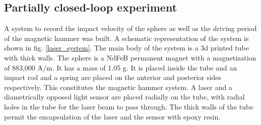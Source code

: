 \documentclass[letterpaper, 10 pt, conference]{ieeeconf}  %
\begin{document}
\begin{table}[]
\centering
\caption{Properties of the coils used in the magnetic test bench}
\label{coil_table}
\vspace{-1.5em}
\end{table}


\subsection{Partially closed-loop experiment}
\label{partialCLexp}
A system to record the impact velocity of the sphere as well as the driving period of the magnetic hammer was built. A schematic representation of the system is shown in fig. \ref{laser_system}. The main body of the system is a 3d printed tube with thick walls. The sphere is a NdFeB permanent magnet with a magnetization of 883,000 A/m. It has a mass of 1.05 g. It is placed inside the tube and an impact rod and a spring are placed on the anterior and posterior sides respectively. This constitutes the magnetic hammer system. A laser and a diametrically opposed light sensor are placed radially on the tube, with radial holes in the tube for the laser beam to pass through. The thick walls of the tube permit the encapsulation of the laser and the sensor with epoxy resin.\par
\end{document}

